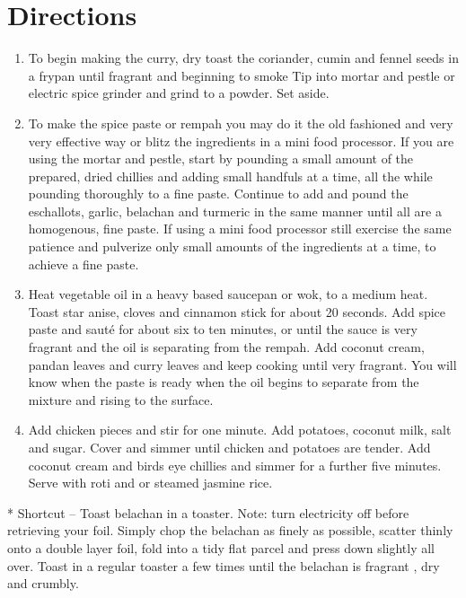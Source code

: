 \section*{Directions}
\begin{enumerate}
	\item To begin making the curry, dry toast the coriander, cumin and fennel seeds in a frypan until fragrant and beginning to smoke
		 Tip into mortar and pestle or electric spice grinder and grind to a powder. Set aside.
	\item To make the spice paste or rempah you may do it the old fashioned and very very effective way or blitz the ingredients in a mini food processor.
		If you are using the mortar and pestle, start by pounding a small amount of the prepared, dried chillies and adding small handfuls at a time, all the while pounding thoroughly to a 			fine paste. Continue to add and pound the eschallots, garlic, belachan and turmeric in the same manner until all are a homogenous, fine paste.
		If using a mini food processor still exercise the same patience and pulverize only small amounts of the ingredients at a time, to achieve a fine paste.
	\item Heat vegetable oil in a heavy based saucepan or wok, to a medium heat. Toast star anise, cloves and cinnamon stick for about 20 seconds.
		Add spice paste and sauté for about six to ten minutes, or until the sauce is very fragrant and the oil is separating from the rempah.
		Add coconut cream, pandan leaves and curry leaves and keep cooking until very fragrant.
		You will know when the paste is ready when the oil begins to separate from the mixture and rising to the surface.
	\item Add chicken pieces and stir for one minute. Add potatoes, coconut milk, salt and sugar.
		Cover and simmer until chicken and potatoes are tender. Add coconut cream and birds eye chillies and simmer for a further five minutes.
		Serve with roti and or steamed jasmine rice.
\end{enumerate}
* Shortcut – Toast belachan in a toaster. Note: turn electricity off before retrieving your foil. Simply chop the belachan as finely as possible, scatter thinly onto a double layer foil, fold into a tidy flat parcel and press down slightly all over. Toast in a regular toaster a few times until the belachan is fragrant , dry and crumbly.

